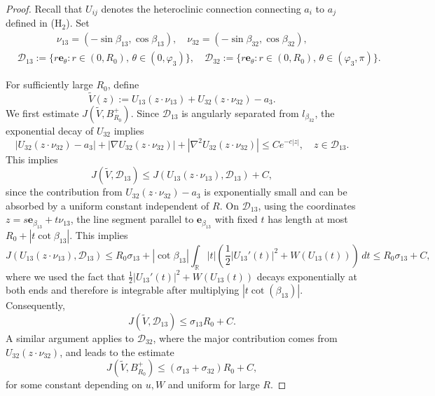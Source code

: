 \documentclass[leqno,11pt]{amsart}
\let\f=\frac
\let\na=\nabla
\theoremstyle{remark}
\newcommand{\BR}{\mathbb{R}}
\begin{document}
\begin{proof}
Recall that $U_{ij}$ denotes the heteroclinic connection connecting $a_i$ to $a_j$ defined in ($\mathrm{H}_2$).  Set
\begin{align*}
   &\quad\qquad\quad\nu_{13}=(-\sin\beta_{13},\cos\beta_{13}),\quad \nu_{32}=(-\sin\beta_{32},\cos\beta_{32}),\\
   & \mathcal{D}_{13}:= \{r\mathbf{e}_\theta: r\in (0,R_0),\,\theta\in(0,\varphi_3)\},\quad \mathcal{D}_{32}:= \{r\mathbf{e}_\theta: r\in (0,R_0),\,\theta\in(\varphi_3,\pi)\}.
\end{align*}   

For sufficiently large $R_0$, define
\begin{equation*}
    \tilde{V}(z):= U_{13}(z\cdot \nu_{13})+U_{32}(z\cdot \nu_{32})-a_3. 
\end{equation*}
We first estimate $J(\tilde{V},B_{R_0}^+)$. Since $\mathcal{D}_{13}$ is angularly separated from $l_{\beta_{32}}$, the exponential decay of $U_{32}$ implies 
\begin{equation*}
    |U_{32}(z\cdot \nu_{32})-a_3|+|\na U_{32}(z\cdot \nu_{32})|+|\na^2 U_{32}(z\cdot \nu_{32})|\leq Ce^{-c|z|},\quad z\in\mathcal{D}_{13}.
\end{equation*}
This implies
\begin{equation*}
    J(\tilde{V},\mathcal{D}_{13}) \leq J(U_{13}(z\cdot \nu_{13}),\mathcal{D}_{13})+C,
\end{equation*}
since the contribution from $U_{32}(z\cdot \nu_{32})-a_3$ is exponentially small and can be absorbed by a uniform constant independent of $R$. On $\mathcal{D}_{13}$, using the coordinates $z= s \mathbf{e}_{\beta_{13}}+t\nu_{13}$, the line segment parallel to $\mathbf{e}_{\beta_{13}}$ with fixed $t$ has length at most $R_0+|t\cot{\beta_{13}}|$. This implies 
\[
J(U_{13}(z\cdot \nu_{13}),\mathcal{D}_{13})\leq R_0 \sigma_{13}+ |\cot{\beta_{13}}|\int_\BR |t| \left(\f12|U_{13}'(t)|^2+W(U_{13}(t))\right)\,dt\leq R_0\sigma_{13}+C,
\]
where we used the fact that $\f12|U_{13}'(t)|^2+W(U_{13}(t))$ decays exponentially at both ends and therefore is integrable after multiplying $|t\cot(\beta_{13})|$. Consequently,
\[
J(\tilde{V},\mathcal{D}_{13})\leq \sigma_{13}R_0+C.
\]
A similar argument applies to $\mathcal{D}_{32}$, where the major contribution comes from $U_{32}(z\cdot \nu_{32})$, and leads to the estimate
\[
J(\tilde{V},B_{R_0}^+)\leq (\sigma_{13}+\sigma_{32})R_0+C,
\]
for some constant depending on $u,W$ and uniform for large $R$. 


\end{proof}
\end{document}
